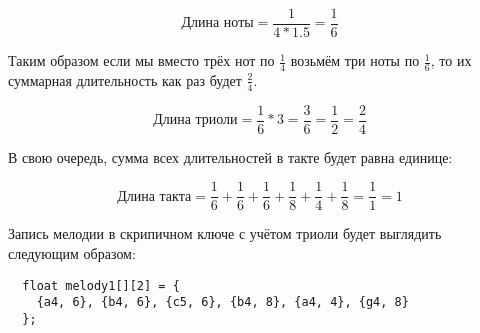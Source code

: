 \documentclass[../sparc.tex]{subfiles}
\begin{document}
\begin{equation}
  \mbox{Длина ноты} = \frac{1}{4 * 1.5} = \frac{1}{6}
\end{equation}

Таким образом если мы вместо трёх нот по $\frac{1}{4}$ возьмём три ноты по
$\frac{1}{6}$, то их суммарная длительность как раз будет $\frac{2}{4}$.

\begin{equation}
  \mbox{Длина триоли} = \frac{1}{6} * 3 = \frac{3}{6} = \frac{1}{2}
  = \frac{2}{4}
\end{equation}

В свою очередь, сумма всех длительностей в такте будет равна единице:

\begin{equation}
  \mbox{Длина такта} = \frac{1}{6} + \frac{1}{6}
  + \frac{1}{6} + \frac{1}{8} + \frac{1}{4} + \frac{1}{8}
  = \frac{1}{1} = 1
\end{equation}

Запись мелодии в скрипичном ключе с учётом триоли будет выглядить следующим
образом:

\begin{verbatim}
  float melody1[][2] = {
    {a4, 6}, {b4, 6}, {c5, 6}, {b4, 8}, {a4, 4}, {g4, 8}
  };
\end{verbatim}
\end{document}

